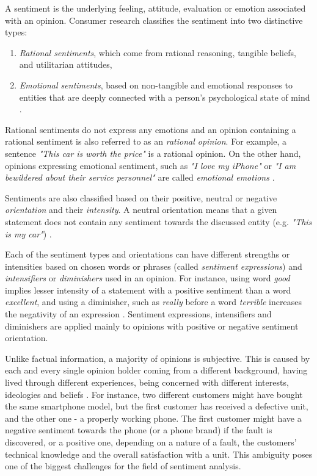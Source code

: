A sentiment is the underlying feeling, attitude, evaluation or emotion associated with an opinion. Consumer research classifies the sentiment into two distinctive types:

\begin{enumerate}
\item \emph{Rational sentiments}, which come from rational reasoning, tangible beliefs, and utilitarian attitudes,
\item \emph{Emotional sentiments}, based on non-tangible and emotional responses to entities that are deeply connected with a person's psychological state of mind \cite{chaudhuri:2006}.
\end{enumerate}

Rational sentiments do not express any emotions and an opinion containing a rational sentiment is also referred to as an \emph{rational opinion}. For example, a sentence \textit{"This car is worth the price"} is a rational opinion. On the other hand, opinions expressing emotional sentiment, such as \textit{"I love my iPhone"} or \textit{"I am bewildered about their service personnel"} are called \emph{emotional emotions} \cite{liu}. 

Sentiments are also classified based on their positive, neutral or negative \emph{orientation} and their \emph{intensity}. A neutral orientation means that a given statement does not contain any sentiment towards the discussed entity (e.g. \textit{"This is my car"}) \cite{liu}.

Each of the sentiment types and orientations can have different strengths or intensities based on chosen words or phrases (called \emph{sentiment expressions}) and \emph{intensifiers} or \emph{diminishers} used in an opinion. For instance, using word \textit{{good}} implies lesser intensity of a statement with a positive sentiment than a word \textit{{excellent}}, and using a diminisher, such as \textit{{really}} before a word \textit{{terrible}} increases the negativity of an expression \cite{liu}. Sentiment expressions, intensifiers and diminishers are applied mainly to opinions with positive or negative sentiment orientation.

Unlike factual information, a majority of opinions is subjective. This is caused by each and every single opinion holder coming from a different background, having lived through different experiences, being concerned with different interests, ideologies and beliefs \cite{liu}. For instance, two different customers might have bought the same smartphone model, but the first customer has received a defective unit, and the other one - a properly working phone. The first customer might have a negative sentiment towards the phone (or a phone brand) if the fault is discovered, or a positive one, depending on a nature of a fault, the customers' technical knowledge and the overall satisfaction with a unit. This ambiguity poses one of the biggest challenges for the field of sentiment analysis.

